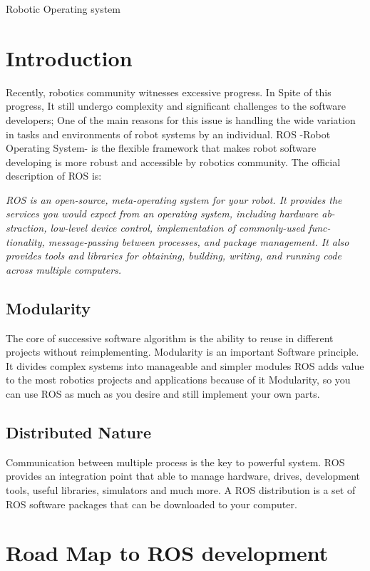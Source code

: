 \documentclass[a4paper]{book}
\begin{document}
	\begin{chapter}{Robotic Operating system}
\tableofcontents
\newpage		
		
\section{Introduction}
Recently, robotics community witnesses excessive progress. In Spite of this progress, It still undergo complexity and significant challenges to the software developers; One of the main reasons for this issue is  handling the wide variation in tasks and environments of robot systems by an individual. 
ROS -Robot Operating System- is the flexible framework that makes robot software developing is more robust and accessible by robotics community. The official description of ROS is:\vspace{.3cm}
\newline

\textit{ROS is an open-source, meta-operating system for your robot. It provides the
	services you would expect from an operating system, including hardware ab-
	straction, low-level device control, implementation of commonly-used func-
	tionality, message-passing between processes, and package management. It
	also provides tools and libraries for obtaining, building, writing, and running
	code across multiple computers.
}
\subsection{Modularity}
The core of successive software algorithm is the ability to reuse in different projects without reimplementing. Modularity is an important Software principle. It divides complex systems into manageable and simpler modules 
ROS adds value to the most robotics projects and applications because of it Modularity, so you can use ROS as much as you desire and still implement your own parts.
\subsection{Distributed Nature }
Communication between multiple process  is the key to powerful system. ROS provides an integration point that able to manage hardware, drives, development tools, useful libraries, simulators and much more. 
A ROS distribution is a set of ROS software packages that can be downloaded
to your computer.
\newpage
\section{Road Map to ROS development}

\end{chapter}
\end{document}

